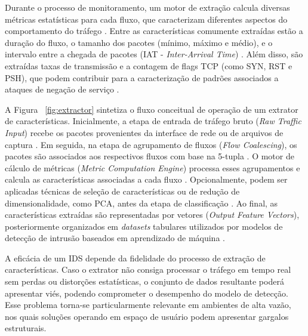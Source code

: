 \documentclass[conference]{IEEEtran}
\begin{document}
Durante o processo de monitoramento, um motor de extração calcula diversas métricas estatísticas para cada fluxo, que caracterizam diferentes aspectos do comportamento do tráfego \cite{apostu_detecting_2025, shafi_ntlflowlyzer_2025}. Entre as características comumente extraídas estão a duração do fluxo, o tamanho dos pacotes (mínimo, máximo e médio), e o intervalo entre a chegada de pacotes (IAT - \textit{Inter-Arrival Time}) \cite{apostu_detecting_2025, suvra_efficient_2025}. Além disso, são extraídas taxas de transmissão e a contagem de flags TCP (como SYN, RST e PSH), que podem contribuir para a caracterização de padrões associados a ataques de negação de serviço \cite{suvra_efficient_2025, shafi_unveiling_2024, shafi_ntlflowlyzer_2025}.

A Figura ~\ref{fig:extractor} sintetiza o fluxo conceitual de operação de um extrator de características. Inicialmente, a etapa de entrada de tráfego bruto (\textit{Raw Traffic Input}) recebe os pacotes provenientes da interface de rede ou de arquivos de captura \cite{apostu_detecting_2025}. Em seguida, na etapa de agrupamento de fluxos (\textit{Flow Coalescing}), os pacotes são associados aos respectivos fluxos com base na 5-tupla \cite{apostu_detecting_2025}. O motor de cálculo de métricas (\textit{Metric Computation Engine}) processa esses agrupamentos e calcula as características associadas a cada fluxo \cite{apostu_detecting_2025, shafi_ntlflowlyzer_2025}. Opcionalmente, podem ser aplicadas técnicas de seleção de características ou de redução de dimensionalidade, como PCA, antes da etapa de classificação \cite{gelgi_systematic_2024}. Ao final, as características extraídas são representadas por vetores (\textit{Output Feature Vectors}), posteriormente organizados em \textit{datasets} tabulares utilizados por modelos de detecção de intrusão baseados em aprendizado de máquina \cite{shafi_unveiling_2024, apostu_detecting_2025}.

A eficácia de um IDS depende da fidelidade do processo de extração de características. Caso o extrator não consiga processar o tráfego em tempo real sem perdas ou distorções estatísticas, o conjunto de dados resultante poderá apresentar viés, podendo comprometer o desempenho do modelo de detecção. Esse problema torna-se particularmente relevante em ambientes de alta vazão, nos quais soluções operando em espaço de usuário podem apresentar gargalos estruturais.
\end{document}
